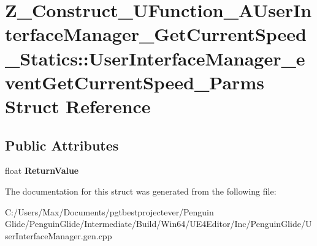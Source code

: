 \hypertarget{struct_z___construct___u_function___a_user_interface_manager___get_current_speed___statics_1_1_ubc346b0ed869520295c1fcbac47fc630}{}\section{Z\+\_\+\+Construct\+\_\+\+U\+Function\+\_\+\+A\+User\+Interface\+Manager\+\_\+\+Get\+Current\+Speed\+\_\+\+Statics\+::User\+Interface\+Manager\+\_\+event\+Get\+Current\+Speed\+\_\+\+Parms Struct Reference}
\label{struct_z___construct___u_function___a_user_interface_manager___get_current_speed___statics_1_1_ubc346b0ed869520295c1fcbac47fc630}
\subsection*{Public Attributes}
\begin{DoxyCompactItemize}
\item 
\mbox{\label{struct_z___construct___u_function___a_user_interface_manager___get_current_speed___statics_1_1_ubc346b0ed869520295c1fcbac47fc630_a5b58e4ed8d2d562b4bc762e1d0b8612a}} 
float {\bfseries Return\+Value}
\end{DoxyCompactItemize}


The documentation for this struct was generated from the following file\+:\begin{DoxyCompactItemize}
\item 
C\+:/\+Users/\+Max/\+Documents/pgtbestprojectever/\+Penguin Glide/\+Penguin\+Glide/\+Intermediate/\+Build/\+Win64/\+U\+E4\+Editor/\+Inc/\+Penguin\+Glide/User\+Interface\+Manager.\+gen.\+cpp\end{DoxyCompactItemize}
